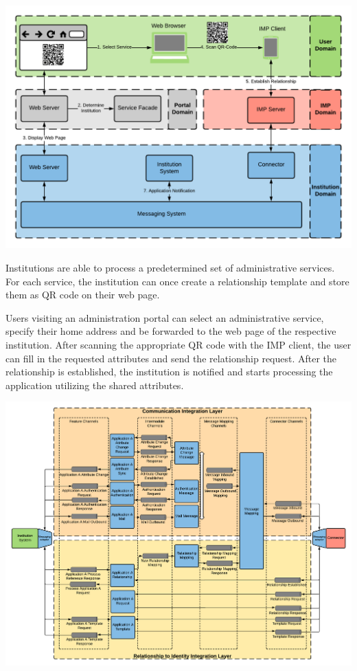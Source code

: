 \begin{center}
    \includegraphics[scale=0.6]{Diagrams/Integration Architecture 2/Technological Integration/3. Application Overview.pdf}
\end{center}

Institutions are able to process a predetermined set of administrative services. For each service, the institution can once create a relationship template and store them as QR code on their web page. 

Users visiting an administration portal can select an administrative service, specify their home address and be forwarded to the web page of the respective institution. After scanning the appropriate QR code with the IMP client, the user can fill in the requested attributes and send the relationship request. After the relationship is established, the institution is notified and starts processing the application utilizing the shared attributes.

\begin{center}
    \includegraphics[scale=0.5]{Diagrams/Integration Architecture 2/Technological Integration/2. Messaging Overview.pdf}
\end{center}

